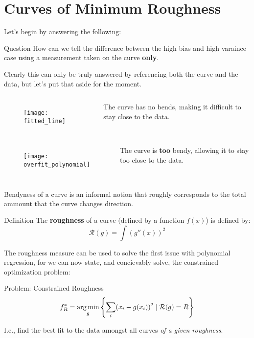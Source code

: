 \section{Curves of Minimum Roughness}
%
%
\begin{frame}
  Let's begin by answering the following:
  \begin{block}{Question}
    How can we tell the difference between the high bias and high varaince case using a measurement taken on the curve \textbf{only}.
  \end{block}
  Clearly this can only be truly answered by referencing both the curve and the data, but let's put that aside for the moment.
\end{frame}
%
%
\begin{frame}
  \begin{columns}
      \begin{figure}
        \texttt{[image: fitted\_line]}
      \end{figure}
      The curve has no bends, making it difficult to stay close to the data.
  \end{columns}
\end{frame}
%
%
\begin{frame}
  \begin{columns}
      \begin{figure}
        \texttt{[image: overfit\_polynomial]}
      \end{figure}
      The curve is \textbf{too} bendy, allowing it to stay too close to the data.
  \end{columns}
\end{frame}
%
%
\begin{frame}
  Bendyness of a curve is an informal notion that roughly corresponds to the total ammount that the curve changes direction.
\end{frame}
%
%
\begin{frame}
  \begin{block}{Definition}
    The \textbf{roughness} of a curve (defined by a function $f(x)$) is defined by:
    $$ \mathcal{R}(g) = \int (g''(x))^2 $$
  \end{block}
\end{frame}
%
%
\begin{frame}
  The roughness measure can be used to solve the first issue with polynomial regression, for we can now state, and concievably solve, the constrained optimization problem:
  \begin{block}{Problem: Constrained Roughness}
    $$ f_R^* = \operatorname*{arg\,min}_{g} \left\{ \sum_i (x_i - g(x_i))^2 \mid \mathcal{R}(g) = R \right\} $$
  \end{block}
  I.e., find the best fit to the data amongst all curves \textit{of a given roughness}.
\end{frame}
